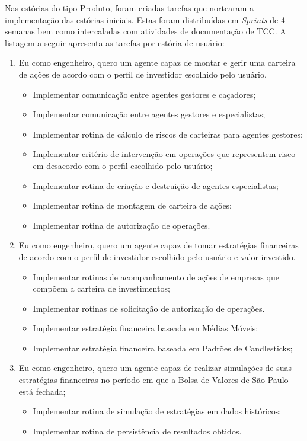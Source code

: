 Nas estórias do tipo Produto, foram criadas tarefas que nortearam a implementação das estórias iniciais. Estas foram distribuídas em \textit{Sprints} de 4 semanas bem como intercaladas com atividades de documentação de TCC. A listagem a seguir apresenta as tarefas por estória de usuário: 

\begin{enumerate}
\item Eu como engenheiro, quero um agente capaz de montar e gerir uma carteira de ações de acordo com o perfil de investidor escolhido pelo usuário.
		\begin{itemize}
		\item Implementar comunicação entre agentes gestores e caçadores;
		\item Implementar comunicação entre agentes gestores e especialistas;
		\item Implementar rotina de cálculo de riscos de carteiras para agentes gestores;
		\item Implementar critério de intervenção em operações que representem risco em desacordo com o perfil escolhido pelo usuário;
		\item Implementar rotina de criação e destruição de agentes especialistas;
		\item Implementar rotina de montagem de carteira de ações;
		\item Implementar rotina de autorização de operações.
		\end{itemize}
\item Eu como engenheiro, quero um agente capaz de tomar estratégias financeiras de acordo com o perfil de investidor escolhido pelo usuário e valor investido.
		\begin{itemize}
		\item Implementar rotinas de acompanhamento de ações de empresas que compõem a carteira de investimentos;
		\item Implementar rotinas de solicitação de autorização de operações.
		\item Implementar estratégia financeira baseada em Médias Móveis;
		\item Implementar estratégia financeira baseada em Padrões de Candlesticks; 
		\end{itemize}
\item Eu como engenheiro, quero um agente capaz de realizar simulações de suas estratégias financeiras no período em que a Bolsa de Valores de São Paulo está fechada;
		\begin{itemize}
		\item Implementar rotina de simulação de estratégias em dados históricos;
		\item Implementar rotina de persistência de resultados obtidos.
		\end{itemize}


\end{enumerate}
